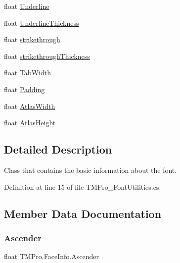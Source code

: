 \begin{DoxyCompactItemize}
\item 
float \mbox{\hyperlink{class_t_m_pro_1_1_face_info_ac84141f34b2d75aa4bac5170c94a2970}{Underline}}
\item 
float \mbox{\hyperlink{class_t_m_pro_1_1_face_info_a0dd686bb840ba17903f59848268af48c}{Underline\+Thickness}}
\item 
float \mbox{\hyperlink{class_t_m_pro_1_1_face_info_af695879bc7d227e74aa6429459470efb}{strikethrough}}
\item 
float \mbox{\hyperlink{class_t_m_pro_1_1_face_info_a563ba55adbbfa14728a9ae3cd67badc3}{strikethrough\+Thickness}}
\item 
float \mbox{\hyperlink{class_t_m_pro_1_1_face_info_a05d6a8a6e72fceefc77d70a61b3ecf8c}{Tab\+Width}}
\item 
float \mbox{\hyperlink{class_t_m_pro_1_1_face_info_a4e9e91ce1b982e2379ade0eed9341492}{Padding}}
\item 
float \mbox{\hyperlink{class_t_m_pro_1_1_face_info_acede0e79039968c3bdad0bc862b0c94e}{Atlas\+Width}}
\item 
float \mbox{\hyperlink{class_t_m_pro_1_1_face_info_ac534fec31799477b6ed641f1f52daaeb}{Atlas\+Height}}
\end{DoxyCompactItemize}


\subsection{Detailed Description}
Class that contains the basic information about the font. 



Definition at line 15 of file T\+M\+Pro\+\_\+\+Font\+Utilities.\+cs.



\subsection{Member Data Documentation}
\mbox{\label{class_t_m_pro_1_1_face_info_a24c7184e75041c3aff9b4bb8bd12e17b}} 
\subsubsection{\texorpdfstring{Ascender}{Ascender}}
{\footnotesize\ttfamily float T\+M\+Pro.\+Face\+Info.\+Ascender}



